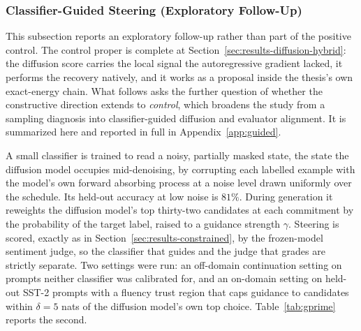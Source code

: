 \subsubsection{Classifier-Guided Steering (Exploratory Follow-Up)}
\label{sec:results-diffusion-guided}
\label{sec:results-diffusion-gprime} %

This subsection reports an exploratory follow-up rather than part of the positive control. The control proper is complete at Section~\ref{sec:results-diffusion-hybrid}: the diffusion score carries the local signal the autoregressive gradient lacked, it performs the recovery natively, and it works as a proposal inside the thesis's own exact-energy chain. What follows asks the further question of whether the constructive direction extends to \emph{control}, which broadens the study from a sampling diagnosis into classifier-guided diffusion and evaluator alignment. It is summarized here and reported in full in Appendix~\ref{app:guided}.

A small classifier is trained to read a noisy, partially masked state, the state the diffusion model occupies mid-denoising, by corrupting each labelled example with the model's own forward absorbing process at a noise level drawn uniformly over the schedule. Its held-out accuracy at low noise is $81\%$.
During generation it reweights the diffusion model's top thirty-two candidates at each commitment by the probability of the target label, raised to a guidance strength $\gamma$. Steering is scored, exactly as in Section~\ref{sec:results-constrained}, by the frozen-model sentiment judge, so the classifier that guides and the judge that grades are strictly separate. Two settings were run: an off-domain continuation setting on prompts neither classifier was calibrated for, and an on-domain setting on held-out SST-2 prompts with a fluency trust region that caps guidance to candidates within $\delta=5$ nats of the diffusion model's own top choice. Table~\ref{tab:gprime} reports the second.

